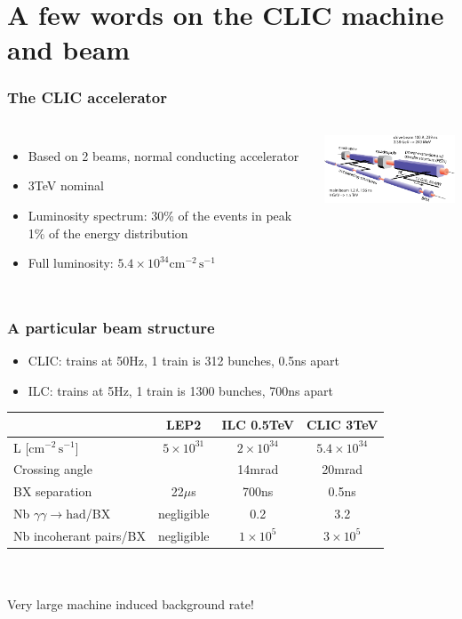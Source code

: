 \documentclass{beamer}
\begin{document}
\section[CLIC]{A few words on the CLIC machine and beam} 
\begin{frame}
\frametitle{The CLIC accelerator}
\begin{columns}[c]
\column{6cm}
\begin{itemize}
  \item Based on 2 beams, normal conducting accelerator
  \item 3TeV nominal 
  \item Luminosity spectrum: 30\% of the events in peak 1\% of the energy
  distribution
  \item Full luminosity: $5.4\times
  10^{34}\textrm{cm}^{-2}\,\textrm{s}^{-1}$
\end{itemize}
\column{6cm}
\includegraphics[width=6cm]{accel}
\end{columns}
\end{frame}

\begin{frame}
\frametitle{A particular beam structure}
\begin{itemize}
  \item CLIC: trains at 50Hz, 1 train is 312 bunches, 0.5ns apart
  \item ILC: trains at 5Hz, 1 train is 1300 bunches, 700ns apart
\end{itemize}
\centering
\begin{tabular}{lccc}
 & LEP2 & ILC 0.5TeV & CLIC 3TeV\\
 \hline
L [$\textrm{cm}^{-2}\,\textrm{s}^{-1}$] & $5\times 10^{31}$ & $2\times 10^{34}$& $5.4\times 10^{34}$ \\ 
\hline
Crossing angle & ~ & 14mrad & 20mrad\\
\hline
BX separation & 22$\mu$s & 700ns & \alert{0.5ns}\\
\hline
Nb $\gamma\gamma\to\textrm{had}$/BX & negligible & 0.2 & \alert{3.2}\\
\hline
Nb incoherant pairs/BX & negligible & $1\times 10^5$ & \alert{$3\times10^5$}\\
\hline
\end{tabular}
~\\
~\\
\alert{Very large machine induced background rate!}
\end{frame}
\end{document}
